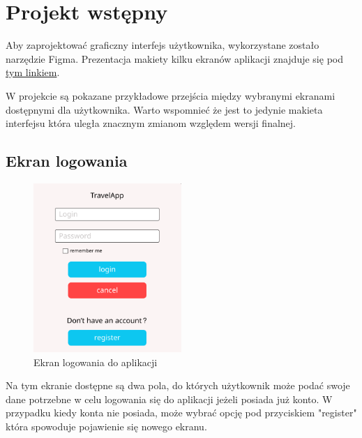 \newpage
\section{Projekt wstępny}
Aby zaprojektować graficzny interfejs użytkownika, wykorzystane zostało narzędzie Figma. Prezentacja makiety kilku ekranów aplikacji znajduje się pod \href{https://www.figma.com/proto/1yxKJbcj7I3atl6e7OpHO8/TravelApp?type=design&node-id=1-247&scaling=min-zoom&page-id=0%3A1&starting-point-node-id=1%3A154}{tym linkiem}.

W projekcie są pokazane przykładowe przejścia między wybranymi ekranami dostępnymi dla użytkownika. Warto wspomnieć że jest to jedynie makieta interfejsu która uległa znacznym zmianom względem wersji finalnej.

\subsection{Ekran logowania}
\begin{figure}[H]
    \centering
    \includegraphics[width=0.5\textwidth]{img/4/logowanie.png}
    \caption{Ekran logowania do aplikacji}
    \label{fig:proj-wstepny-ekran-logowania}
\end{figure}

Na tym ekranie dostępne są dwa pola, do których użytkownik może podać swoje dane potrzebne w celu logowania się do aplikacji jeżeli posiada już konto. W przypadku kiedy konta nie posiada, może wybrać opcję pod przyciskiem "register" która spowoduje pojawienie się nowego ekranu. \\

